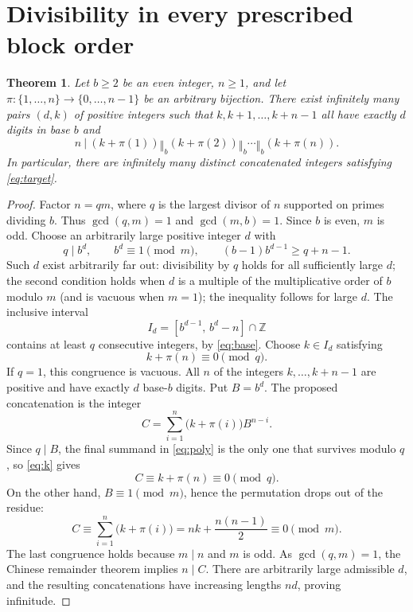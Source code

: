 \documentclass[11pt]{article}
\newtheorem{theorem}{Theorem}
\newcommand{\cat}{\mathbin{\Vert}}
\begin{document}
\section{Divisibility in every prescribed block order}
\begin{theorem}\label{thm:permutation}
Let $b\ge2$ be an even integer, $n\ge1$, and let
$\pi:\{1,\ldots,n\}\to\{0,\ldots,n-1\}$ be an arbitrary bijection.
There exist infinitely many pairs $(d,k)$ of positive integers such that
$k,k+1,\ldots,k+n-1$ all have exactly $d$ digits in base $b$ and
\begin{equation}\label{eq:target}
 n\ \Big|\ (k+\pi(1))\cat_b(k+\pi(2))\cat_b\cdots\cat_b(k+\pi(n)).
\end{equation}
In particular, there are infinitely many distinct concatenated integers
satisfying \eqref{eq:target}.
\end{theorem}
\begin{proof}
Factor $n=qm$, where $q$ is the largest divisor of $n$ supported
on primes dividing $b$. Thus $\gcd(q,m)=1$ and $\gcd(m,b)=1$.
Since $b$ is even, $m$ is odd.
Choose an arbitrarily large positive integer $d$ with
\begin{equation}\label{eq:base}
 q\mid b^d,\qquad b^d\equiv1\pmod m,
 \qquad (b-1)b^{d-1}\ge q+n-1.
\end{equation}
Such $d$ exist arbitrarily far out: divisibility by $q$ holds for all
sufficiently large $d$; the second condition holds when $d$ is a
multiple of the multiplicative order of $b$ modulo $m$ (and is
vacuous when $m=1$); the inequality follows for large $d$.
The inclusive interval
\[
 I_d=[b^{d-1},\,b^d-n]\cap\mathbb Z
\]
contains at least $q$ consecutive integers, by \eqref{eq:base}.
Choose $k\in I_d$ satisfying
\begin{equation}\label{eq:k}
 k+\pi(n)\equiv0\pmod q.
\end{equation}
If $q=1$, this congruence is vacuous. All $n$ of the integers
$k,\ldots,k+n-1$ are positive and have exactly $d$ base-$b$ digits.
Put $B=b^d$. The proposed concatenation is the integer
\begin{equation}\label{eq:poly}
 C=\sum_{i=1}^{n}\bigl(k+\pi(i)\bigr)B^{n-i}.
\end{equation}
Since $q\mid B$, the final summand in \eqref{eq:poly} is the only
one that survives modulo $q$, so \eqref{eq:k} gives
\[
 C\equiv k+\pi(n)\equiv0\pmod q.
\]
On the other hand, $B\equiv1\pmod m$, hence the permutation drops
out of the residue:
\[
 C\equiv\sum_{i=1}^{n}\bigl(k+\pi(i)\bigr)
  =nk+\frac{n(n-1)}2\equiv0\pmod m.
\]
The last congruence holds because $m\mid n$ and $m$ is odd.
As $\gcd(q,m)=1$, the Chinese remainder theorem implies $n\mid C$.
There are arbitrarily large admissible $d$, and the resulting
concatenations have increasing lengths $nd$, proving infinitude.
\end{proof}
\end{document}
